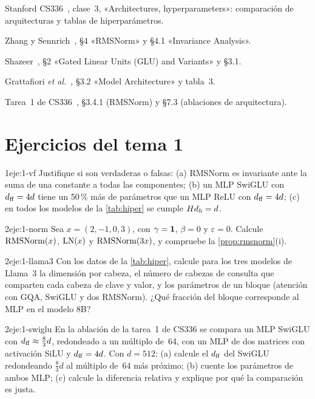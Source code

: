 \begin{lecturas}
\item Stanford CS336~\cite{cs336}, clase~3, «Architectures, hyperparameters»: comparación de arquitecturas y tablas de hiperparámetros.
\item Zhang y Sennrich~\cite{rmsnorm}, §4 «RMSNorm» y §4.1 «Invariance Analysis».
\item Shazeer~\cite{shazeerglu}, §2 «Gated Linear Units (GLU) and Variants» y §3.1.
\item Grattafiori \emph{et al.}~\cite{llama3}, §3.2 «Model Architecture» y tabla~3.
\item Tarea~1 de CS336~\cite{cs336a1}, §3.4.1 (RMSNorm) y §7.3 (ablaciones de arquitectura).
\end{lecturas}

\section*{Ejercicios del tema 1}

\begin{ejercicio}{1}{eje:1-vf}
Justifique si son verdaderas o falsas: (a) RMSNorm es invariante ante la suma de una constante a todas las componentes; (b) un MLP SwiGLU con $d_{\mathrm{ff}}=4d$ tiene un 50\,\% más de parámetros que un MLP ReLU con $d_{\mathrm{ff}}=4d$; (c) en todos los modelos de la \cref{tab:hiper} se cumple $Hd_{h}=d$.
\end{ejercicio}

\begin{ejercicio}{2}{eje:1-norm}
Sea $x=(2,-1,0,3)$, con $\gamma=\mathbf{1}$, $\beta=0$ y $\varepsilon=0$. Calcule $\operatorname{RMSNorm}(x)$, $\operatorname{LN}(x)$ y $\operatorname{RMSNorm}(3x)$, y compruebe la \cref{prop:rmsnorm}(i).
\end{ejercicio}

\begin{ejercicio}{2}{eje:1-llama3}
Con los datos de la \cref{tab:hiper}, calcule para los tres modelos de Llama~3 la dimensión por cabeza, el número de cabezas de consulta que comparten cada cabeza de clave y valor, y los parámetros de un bloque (atención con GQA, SwiGLU y dos RMSNorm). ¿Qué fracción del bloque corresponde al MLP en el modelo 8B?
\end{ejercicio}

\begin{ejercicio}{2}{eje:1-swiglu}
En la ablación de la tarea~1 de CS336 se compara un MLP SwiGLU con $d_{\mathrm{ff}}\approx\frac83 d$, redondeado a un múltiplo de~64, con un MLP de dos matrices con activación SiLU y $d_{\mathrm{ff}}=4d$. Con $d=512$: (a) calcule el $d_{\mathrm{ff}}$ del SwiGLU redondeando $\frac83 d$ al múltiplo de~64 más próximo; (b) cuente los parámetros de ambos MLP; (c) calcule la diferencia relativa y explique por qué la comparación es justa.
\end{ejercicio}

